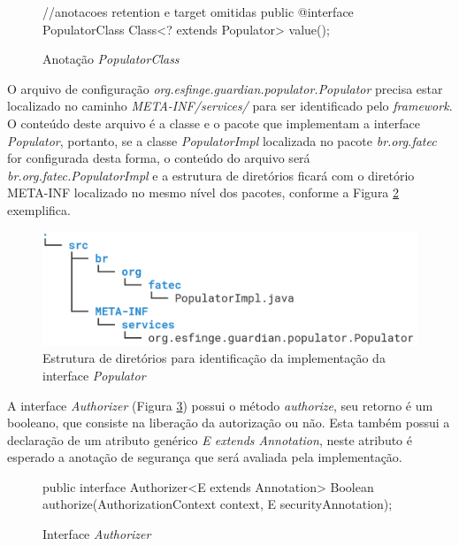 \begin{figure}[H]
    \centering
    \begin{java}
//anotacoes retention e target omitidas
public @interface PopulatorClass {
	Class<? extends Populator> value();
}
    \end{java}
    \caption{Anotação \textit{PopulatorClass}}
    \label{fig:populator-class}
\end{figure}

\par O arquivo de configuração \textit{org.esfinge.guardian.populator.Populator} precisa estar localizado no caminho \textit{META-INF/services/} para ser identificado pelo \textit{framework}. O conteúdo deste arquivo é a classe e o pacote que implementam a interface \textit{Populator}, portanto, se a classe \textit{PopulatorImpl} localizada no pacote \textit{br.org.fatec} for configurada desta forma, o conteúdo do arquivo será \textit{br.org.fatec.PopulatorImpl} e a estrutura de diretórios ficará com o diretório META-INF localizado no mesmo nível dos pacotes, conforme a Figura \ref{fig:populator-tree} exemplifica.

\begin{figure}[H]
    \centering
    \includegraphics[scale=0.3]{src/imagens/cap2/populator-tree.png}
    \caption{Estrutura de diretórios para identificação da implementação da interface \textit{Populator}}
    \label{fig:populator-tree}
\end{figure}

\par A interface \textit{Authorizer} (Figura \ref{fig:interface-authorizer}) possui o método \textit{authorize}, seu retorno é um booleano, que consiste na liberação da autorização ou não. Esta também possui a declaração de um atributo genérico \textit{E extends Annotation}, neste atributo é esperado a anotação de segurança que será avaliada pela implementação. 

\begin{figure}[H]
    \centering
    \begin{java}
public interface Authorizer<E extends Annotation> {
	Boolean authorize(AuthorizationContext context, E securityAnnotation);
}
    \end{java}
    \caption{Interface \textit{Authorizer}}
    \label{fig:interface-authorizer}
\end{figure}

